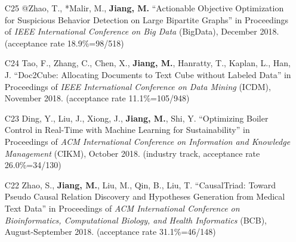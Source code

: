 \documentclass[10pt]{article}
\newenvironment{myindentpar}[1]%
{\begin{list}{}%
         {\setlength{\leftmargin}{#1}}%
         \item[]%
}
{\end{list}}
\newcounter{list}
\begin{document}
\begin{myindentpar}{0.00cm}
\begin{enumerate}[leftmargin=.5cm]
\vspace{-0.1cm}

\item[C25] @Zhao, T., *Malir, M., \textbf{Jiang, M.} ``Actionable Objective Optimization for Suspicious Behavior Detection on Large Bipartite Graphs'' in Proceedings of \emph{IEEE International Conference on Big Data} (BigData), December 2018. (acceptance rate 18.9\%=98/518)

\vspace{-0.1cm}

\item[C24] Tao, F., Zhang, C., Chen, X., \textbf{Jiang, M.}, Hanratty, T., Kaplan, L., Han, J. ``Doc2Cube: Allocating Documents to Text Cube without Labeled Data'' in Proceedings of \emph{IEEE International Conference on Data Mining } (ICDM), November 2018. (acceptance rate 11.1\%=105/948)

\vspace{-0.1cm}

\item[C23] Ding, Y., Liu, J., Xiong, J., \textbf{Jiang, M.}, Shi, Y. ``Optimizing Boiler Control in Real-Time with Machine Learning for Sustainability'' in Proceedings of \emph{ACM International Conference on Information and Knowledge Management} (CIKM), October 2018. (industry track, acceptance rate 26.0\%=34/130)

\vspace{-0.1cm}

\item[C22] Zhao, S., \textbf{Jiang, M.}, Liu, M., Qin, B., Liu, T. ``CausalTriad: Toward Pseudo Causal Relation Discovery and Hypotheses Generation from Medical Text Data'' in Proceedings of \emph{ACM International Conference on Bioinformatics, Computational Biology, and Health Informatics} (BCB), August-September 2018. (acceptance rate 31.1\%=46/148)


\end{enumerate}
\end{myindentpar}
\end{document}
